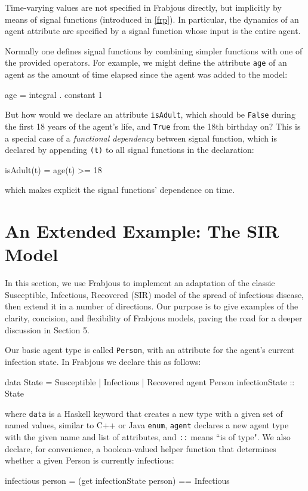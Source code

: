 \documentclass[oribibl]{llncs}
\begin{document}
Time-varying values are not specified in Frabjous directly, but implicitly by means of signal functions (introduced in \ref{frp}). In particular, the dynamics of an agent attribute are specified by a signal function whose input is the entire agent.

   Normally one defines signal functions by combining simpler functions with one of the provided operators. For example, we might define the attribute \lstinline{age} of an agent as the amount of time elapsed since the agent was added to the model:
\begin{code}
	age = integral . constant 1
\end{code}


   But how would we declare an attribute \lstinline{isAdult}, which should be  \lstinline{False} during the first 18 years of the agent's life, and  \lstinline{True} from the 18th birthday on? This is a special case of a \emph{functional dependency} between signal function, which is declared by appending \lstinline{(t)} to all signal functions in the declaration:
\begin{code}
	isAdult(t) = age(t) >= 18
\end{code}
which makes explicit the signal functions' dependence on time.

\section{An Extended Example: The SIR Model}
   In this section, we use Frabjous to implement an adaptation of the classic Susceptible, Infectious, Recovered (SIR) model of the spread of infectious disease, then extend it in a number of directions. Our purpose is to give examples of the clarity, concision, and flexibility of Frabjous models, paving the road for a deeper discussion in Section 5.

 Our basic agent type is called \lstinline{Person}, with an attribute for the agent's current infection state. In Frabjous we declare this as follows: 
\begin{code}
	data State = Susceptible | Infectious | Recovered 
	agent Person { infectionState :: State} 
\end{code}
where \lstinline{data} is a Haskell keyword that creates a new type with a given set of named values, similar to C++ or Java \lstinline{enum}, \lstinline{agent} declares a new agent type with the given name and list of attributes, and \lstinline{::} means ``is of type".  We also declare, for convenience, a boolean-valued helper function that determines whether a given Person is currently infectious: 
\begin{code}
	infectious person = (get infectionState person) == Infectious
\end{code}
\end{document}
